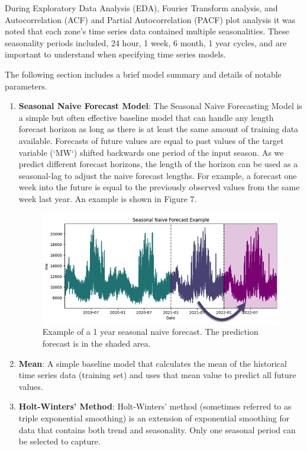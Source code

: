 \documentclass[sigconf]{acmart}
\begin{document}
  During Exploratory Data Analysis (EDA), Fourier Transform analysis, and  Autocorrelation (ACF) and Partial Autocorrelation (PACF) plot analysis it was noted that each zone's time series data contained multiple seasonalities. These seasonality periods included, 24 hour, 1 week, 6 month, 1 year cycles, and are important to understand when specifying time series models.
  
  The following section includes a brief model summary and details of notable parameters.
    
\begin{enumerate}
    \item\textbf{Seasonal Naive Forecast Model}: The Seasonal Naive Forecasting Model is a simple but often effective baseline model that can handle any length forecast horizon as long as there is at least the same amount of training data available. Forecasts of future values are equal to past values of the target variable (`MW`) shifted backwards one period of the input season. As we predict different forecast horizons, the length of the horizon can be used as a seasonal-lag to adjust the naive forecast lengths. For example, a forecast one week into the future is equal to the previously observed values from the same week last year. An example is shown in Figure 7.
         \begin{figure}[hbt!]
    	\includegraphics[width=\linewidth]{Images/Seasonal_Naive.png}
    	\caption{Example of a 1 year seasonal naive forecast. The prediction forecast is in the shaded area.}
    	\Description{}
   	 \label{fig:naive}
  	\end{figure}
    \item\textbf{Mean}: A simple baseline model that calculates the mean of the historical time series data (training set) and uses that mean value to predict all future values.
    \item\textbf{Holt-Winters' Method}: Holt-Winters’ method (sometimes referred to as triple exponential smoothing) is an extension of exponential smoothing for data that contains both trend and seasonality. Only one seasonal period can be selected to capture.

\end{enumerate}
\end{document}
